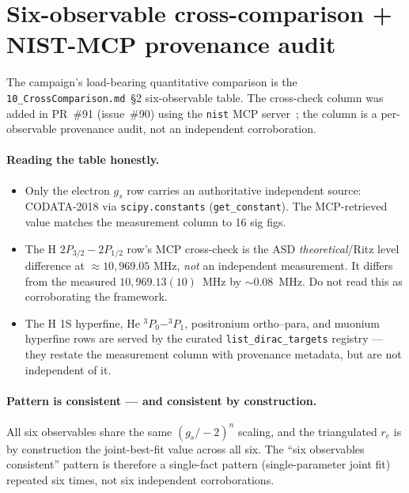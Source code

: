 \section{Six-observable cross-comparison + NIST-MCP provenance audit}
\label{sec:findings-per-observable}

The campaign's load-bearing quantitative comparison is the
\texttt{10\_CrossComparison.md}~\S2 six-observable table. The cross-check
column was added in PR~\#91 (issue~\#90) using the \texttt{nist} MCP
server~\cite{nist_mcp_pr91}; the column is a per-observable provenance
audit, not an independent corroboration.



\paragraph{Reading the table honestly.}
\begin{itemize}[topsep=2pt,itemsep=0pt]
  \item Only the electron $g_s$ row carries an authoritative independent
        source: CODATA-2018 via \texttt{scipy.constants}
        (\texttt{get\_constant}). The MCP-retrieved value matches the
        measurement column to 16 sig figs.
  \item The H $2P_{3/2}{-}2P_{1/2}$ row's MCP cross-check is the ASD
        \emph{theoretical}/Ritz level difference at $\approx 10{,}969.05$ MHz,
        \emph{not} an independent measurement. It differs from the measured
        $10{,}969.13(10)$~MHz by $\sim 0.08$~MHz. Do not read this as
        corroborating the framework.
  \item The H 1S hyperfine, He $^3P_0{-}^3P_1$, positronium ortho--para,
        and muonium hyperfine rows are served by the curated
        \texttt{list\_dirac\_targets} registry --- they restate the
        measurement column with provenance metadata, but are not independent
        of it.
\end{itemize}

\paragraph{Pattern is consistent --- and consistent by construction.}
All six observables share the same $(g_s/{-}2)^n$ scaling, and the
triangulated $r_e$ is by construction the joint-best-fit value across all
six. The ``six observables consistent'' pattern is therefore a single-fact
pattern (single-parameter joint fit) repeated six times, not six independent
corroborations.

